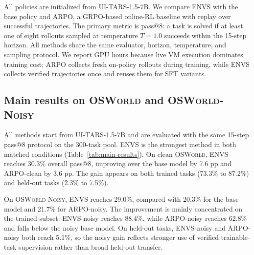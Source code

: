 \documentclass[11pt]{article}
\begin{document}
All policies are initialized from UI-TARS-1.5-7B. We compare ENVS with
the base policy and ARPO, a GRPO-based online-RL baseline with replay
over successful trajectories. The primary metric is pass@8: a task is
solved if at least one of eight rollouts sampled at temperature
$T=1.0$ succeeds within the 15-step horizon. All methods share the same
evaluator, horizon, temperature, and sampling protocol. We report GPU
hours because live VM execution dominates training cost; ARPO collects
fresh on-policy rollouts during training, while ENVS collects verified
trajectories once and reuses them for SFT variants.

\subsection{Main results on \textsc{OSWorld} and \textsc{OSWorld-Noisy}}

All methods start from UI-TARS-1.5-7B and are evaluated with the same
15-step pass@8 protocol on the 300-task pool. ENVS is the strongest
method in both matched conditions (Table~\ref{tab:main-results}). On
clean \textsc{OSWorld}, ENVS reaches 30.3\% overall pass@8, improving
over the base model by 7.6 pp and ARPO-clean by 3.6 pp. The gain appears
on both trained tasks (73.3\% to 87.2\%) and held-out tasks (2.3\% to
7.5\%).

On \textsc{OSWorld-Noisy}, ENVS reaches 29.0\%, compared with 20.3\%
for the base model and 21.7\% for ARPO-noisy. The improvement is mainly
concentrated on the trained subset: ENVS-noisy reaches 88.4\%, while
ARPO-noisy reaches 62.8\% and falls below the noisy base model. On
held-out tasks, ENVS-noisy and ARPO-noisy both reach 5.1\%, so the noisy
gain reflects stronger use of verified trainable-task supervision rather
than broad held-out transfer.
\end{document}
